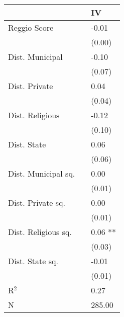 \begin{tabular}{l L{1cm} l}
\toprule
 & & IV \\
\midrule
Reggio Score & & -0.01 \\
& & (0.00) \\
Dist. Municipal & & -0.10 \\
& & (0.07) \\
Dist. Private & & 0.04 \\
& & (0.04) \\
Dist. Religious & & -0.12 \\
& & (0.10) \\
Dist. State & & 0.06 \\
& & (0.06) \\
Dist. Municipal sq. & & 0.00 \\
& & (0.01) \\
Dist. Private sq. & & 0.00 \\
& & (0.01) \\
Dist. Religious sq. & & 0.06 ** \\
& & (0.03) \\
Dist. State sq. & & -0.01 \\
& & (0.01) \\
\midrule
R$^2$ & & 0.27 \\
N & & 285.00 \\
\bottomrule
\end{tabular}

